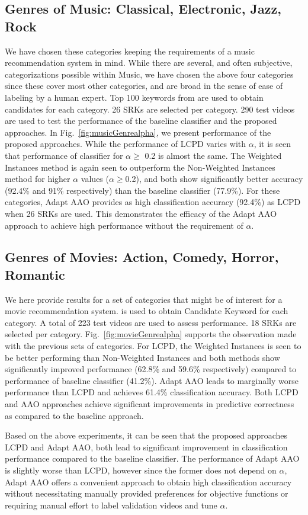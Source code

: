 \subsection{Genres of Music: Classical, Electronic, Jazz, Rock}
We have chosen these categories keeping the requirements of a music recommendation system in mind. While there are several, and often subjective, categorizations possible within Music, we have chosen the above four categories since these cover most other categories, and are broad in the sense of ease of labeling by a human expert. Top 100 keywords from \cite{ReverseDictionary}   are used to obtain candidates for each category. 26 SRKs are selected per category. 290 test videos are used to test the performance of the baseline classifier and the proposed approaches. In Fig.~\ref{fig:musicGenrealpha}, we present performance of the proposed approaches. While the performance of LCPD varies with $\alpha$, it is seen that performance of classifier for $\alpha \ge$ 0.2 is almost the same. The Weighted Instances method is again seen to outperform the Non-Weighted Instances method for higher $\alpha$ values ($\alpha \ge$0.2), and both show significantly better accuracy (92.4\% and 91\% respectively) than the baseline classifier (77.9\%). For these categories, Adapt AAO provides as high classification accuracy (92.4\%) as LCPD when 26 SRKs are used. This demonstrates the efficacy of the Adapt AAO approach to achieve high performance without the requirement of $\alpha$. 

\subsection{Genres of Movies: Action, Comedy, Horror, Romantic}
We here provide results for a set of categories that might be of interest for a movie recommendation system. \cite{ReverseDictionary} is used to obtain Candidate Keyword for each category. A total of 223 test videos are used to assess performance. 18 SRKs are selected per category. Fig.~\ref{fig:movieGenrealpha} supports the observation made with the previous sets of categories. For LCPD, the Weighted Instances is seen to be better performing than Non-Weighted Instances and both methods show significantly improved performance (62.8\% and 59.6\% respectively) compared to performance of baseline classifier (41.2\%).  Adapt AAO leads to marginally worse performance than LCPD and achieves 61.4\% classification accuracy. Both LCPD and AAO approaches achieve significant improvements in predictive correctness as compared to the baseline approach. 

Based on the above experiments, it can be seen that the proposed approaches LCPD and Adapt AAO, both lead to significant improvement in classification performance compared to the baseline classifier. The performance of Adapt AAO is slightly worse than LCPD, however since the former does not depend on $\alpha$, Adapt AAO offers a convenient approach to obtain high classification accuracy without necessitating manually provided preferences for objective functions or requiring manual effort to label validation videos and tune $\alpha$. 

